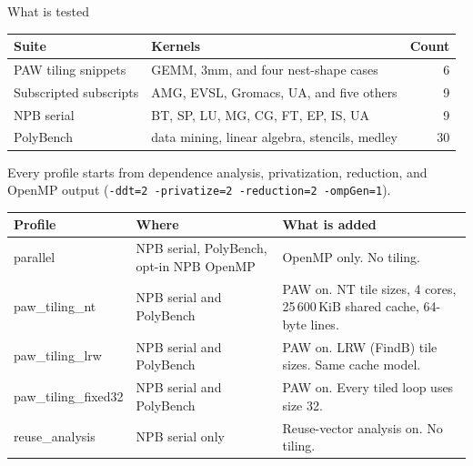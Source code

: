\documentclass[aspectratio=169,11pt]{beamer}
\begin{document}
\begin{frame}{What is tested}
  \small
  \begin{tabular}{@{}llr@{}}
    \toprule
    Suite & Kernels & Count \\
    \midrule
    PAW tiling snippets & GEMM, 3mm, and four nest-shape cases & 6 \\
    Subscripted subscripts & AMG, EVSL, Gromacs, UA, and five others & 9 \\
    NPB serial & BT, SP, LU, MG, CG, FT, EP, IS, UA & 9 \\
    PolyBench & data mining, linear algebra, stencils, medley & 30 \\
    \bottomrule
  \end{tabular}\par
  \vspace{0.3em}
  Every profile starts from dependence analysis, privatization, reduction, and OpenMP output
  (\texttt{-ddt=2 -privatize=2 -reduction=2 -ompGen=1}).
  \vspace{0.25em}
  \footnotesize
  \begin{tabular}{@{}p{}p{}p{}@{}}
    \toprule
    Profile & Where & What is added \\
    \midrule
    parallel & NPB serial, PolyBench, opt-in NPB OpenMP & OpenMP only. No tiling. \\
    paw\_tiling\_nt & NPB serial and PolyBench & PAW on. NT tile sizes, 4 cores, 25\,600\,KiB shared cache, 64-byte lines. \\
    paw\_tiling\_lrw & NPB serial and PolyBench & PAW on. LRW (FindB) tile sizes. Same cache model. \\
    paw\_tiling\_fixed32 & NPB serial and PolyBench & PAW on. Every tiled loop uses size 32. \\
    reuse\_analysis & NPB serial only & Reuse-vector analysis on. No tiling. \\
    \bottomrule
  \end{tabular}\par
  \normalsize
\end{frame}
\end{document}
